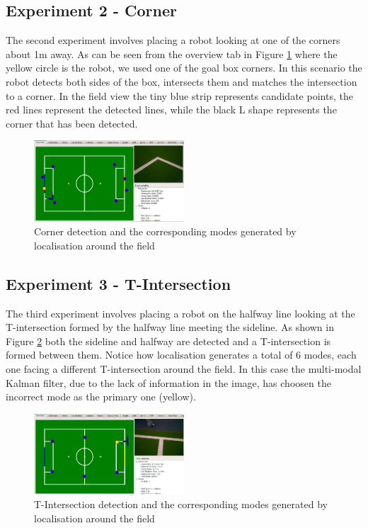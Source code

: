 \documentclass{article}
\begin{document}
\subsection{Experiment 2 - Corner}
The second experiment involves placing a robot looking at one of the corners about 1m away. As can be seen from the overview tab in Figure \ref{fig:exp2} where the yellow circle is the robot, we used one of the goal box corners. In this scenario the robot detects both sides of the box, intersects them and matches the intersection to a corner. In the field view the tiny blue strip represents candidate points, the red lines represent the detected lines, while the black L shape represents the corner that has been detected.

\begin{figure}[h]
\centering
\includegraphics[width=0.5\textwidth]{Pictures/cornerIntersection.jpg}
\caption{Corner detection and the corresponding modes generated by localisation around the field}
\label{fig:exp2}
\end{figure}

\subsection{Experiment 3 - T-Intersection}
The third experiment involves placing a robot on the halfway line looking at the T-intersection formed by the halfway line meeting the sideline. As shown in Figure \ref{fig:exp3} both the sideline and halfway are detected and a T-intersection is formed between them. Notice how localisation generates a total of 6 modes, each one facing a different T-intersection around the field. In this case the multi-modal Kalman filter, due to the lack of information in the image, has choosen the incorrect mode as the primary one (yellow).

\begin{figure}[h]
\centering
\includegraphics[width=0.5\textwidth]{Pictures/tIntersection.jpg}
\caption{T-Intersection detection and the corresponding modes generated by localisation around the field}
\label{fig:exp3}
\end{figure}
\end{document}
